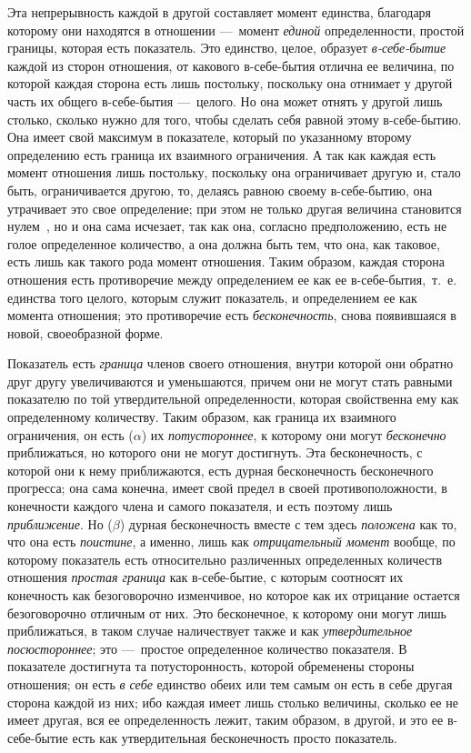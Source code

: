 Эта непрерывность каждой в другой составляет момент единства, благодаря
которому они находятся в отношении —~момент
{\em единой} определенности, простой границы, которая
есть показатель. Это единство, целое, образует
{\em в-себе-бытие} каждой из сторон отношения, от
какового в-себе-бытия отлична ее {}
величина, по которой каждая сторона есть лишь постольку, поскольку она
отнимает у другой часть их общего в-себе-бытия —~целого. Но она может
отнять у другой лишь столько, сколько нужно для того, чтобы сделать себя
равной этому в-себе-бытию. Она имеет свой максимум в показателе, который по
указанному второму определению есть граница их взаимного ограничения. А так
как каждая есть момент отношения лишь постольку, поскольку она ограничивает
другую и, стало быть, ограничивается другою, то, делаясь равною своему
в-себе-бытию, она утрачивает это свое определение; при этом не только
другая величина становится
нулем~\label{bkm:Ref474666305},
но и она сама исчезает, так как она, согласно предположению, есть не голое
определенное количество, а она должна быть тем, что она, как таковое, есть
лишь как такого рода момент отношения. Таким образом, каждая сторона
отношения есть противоречие между определением ее как ее
в-себе-бытия,~т.~е. единства того целого, которым служит показатель, и
определением ее как момента отношения; это противоречие есть
{\em бесконечность}, снова появившаяся в новой,
своеобразной форме.

Показатель есть {\em граница} членов своего отношения,
внутри которой они обратно друг другу увеличиваются и уменьшаются, причем
они не могут стать равными показателю по той утвердительной определенности,
которая свойственна ему как определенному количеству. Таким образом, как
граница их взаимного ограничения, он есть ({\em $\alpha
$}) их {\em потустороннее}, к которому они могут
{\em бесконечно} приближаться, но которого они не могут
достигнуть. Эта бесконечность, с которой они к нему приближаются, есть
дурная бесконечность бесконечного прогресса; она сама конечна, имеет свой
предел в своей противоположности, в конечности каждого члена и самого
показателя, и есть поэтому лишь {\em приближение}. Но
({\em $\beta $}) дурная бесконечность вместе с тем
здесь {\em положена} как то, что она есть
{\em поистине}, а именно, лишь как
{\em отрицательный момент} вообще, по которому
показатель есть относительно различенных определенных количеств отношения
{\em простая граница} как в-себе-бытие, с которым
соотносят их конечность как безоговорочно изменчивое, но которое как их
отрицание остается безоговорочно отличным от них. Это бесконечное, к
которому они могут лишь приближаться, в таком случае наличествует также и
как {\em утвердительное посюстороннее}; это —~простое
определенное количество показателя. В показателе достигнута та
потусторонность, которой обременены стороны отношения; он есть
{\em в себе} единство обеих или тем самым он есть в
себе другая сторона каждой из них; ибо каждая имеет лишь столько величины,
сколько ее не имеет другая, вся ее определенность лежит, таким образом, в
другой, и это ее в-себе-бытие есть как утвердительная бесконечность просто
показатель.

